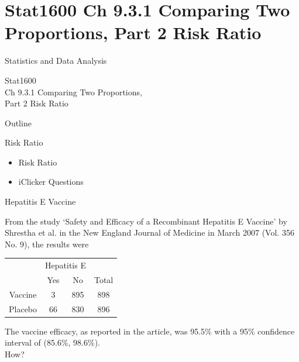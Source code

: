 \documentclass[14pt]{beamer}\usepackage[]{graphicx}\usepackage[]{color}
\begin{document}

\section{Stat1600 Ch 9.3.1 Comparing Two  Proportions, Part 2 Risk Ratio}

\begin{frame}[fragile]{Statistics and Data Analysis}

Stat1600 \\ Ch 9.3.1 Comparing Two  Proportions, \\ Part 2 Risk Ratio

\end{frame}

\begin{frame}[fragile]{Outline}

Risk Ratio  

\begin{itemize}
\item Risk Ratio
\item iClicker Questions
\end{itemize}

\end{frame}

\begin{frame}[fragile]{Hepatitis E Vaccine}

From the study `Safety and Efficacy of a Recombinant Hepatitis E  Vaccine' by Shrestha et al. in the New England Journal of Medicine in  March 2007 (Vol. 356 No. 9), the results were

\begin{tabular}{@{} cccc @{}} \hline
     & \multicolumn{2}{c}{Hepatitis E} \\
     & Yes & No & Total \\ \hline
Vaccine & 3 & 895 & 898 \\
Placebo & 66 & 830 & 896 \\ \hline
\end{tabular}

The vaccine efficacy, as reported in the article, was 95.5\% with a 95\%  confidence interval of (85.6\%, 98.6\%). \\
How?

\end{frame}
\end{document}
